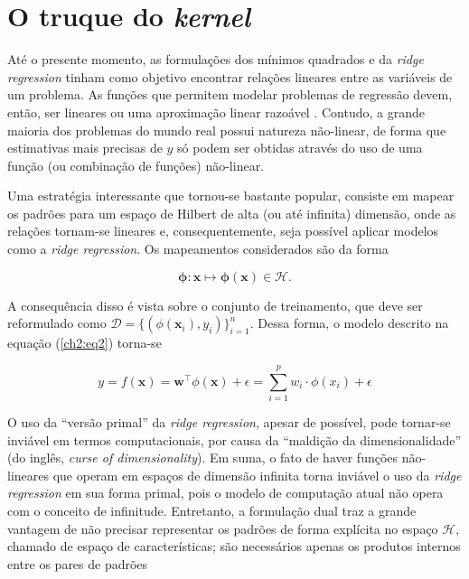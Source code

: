 \section{O truque do \textit{kernel}} \label{sec:kernel-trick}
Até o presente momento, as formulações dos mínimos quadrados e da \textit{ridge regression} tinham como objetivo encontrar relações lineares entre as variáveis de um problema. As funções que permitem modelar problemas de regressão devem, então, ser lineares ou uma aproximação linear razoável \cite{hastie2009}. Contudo, a grande maioria dos problemas do mundo real possui natureza não-linear, de forma que estimativas mais precisas de $y$ só podem ser obtidas através do uso de uma função (ou combinação de funções) não-linear.

Uma estratégia interessante que tornou-se bastante popular, consiste em mapear os padrões para um espaço de Hilbert de alta (ou até infinita) dimensão, onde as relações tornam-se lineares e, consequentemente, seja possível aplicar modelos como a \textit{ridge regression}. Os mapeamentos considerados são da forma

\begin{equation}
    \label{ch2:eq24}
    \mathbf{\phi} : \mathbf{x} \mapsto \mathbf{\phi}(\mathbf{x}) \in \mathcal{H}.
\end{equation}

\noindent A consequência disso é vista sobre o conjunto de treinamento, que deve ser reformulado como $\mathcal{D} = \{(\phi(\mathbf{x}_i), y_i)\}^{n}_{i=1}$. Dessa forma, o modelo descrito na equação (\ref{ch2:eq2}) torna-se

\begin{equation}
    \label{ch2:eq25}
    y = f(\mathbf{x}) = \mathbf{w}^{\top} \phi(\mathbf{x}) + \epsilon = \sum_{i=1}^{p}{w_i \cdot \phi(x_i)} + \epsilon
\end{equation}

O uso da ``versão primal'' da \textit{ridge regression}, apesar de possível, pode tornar-se inviável em termos computacionais, por causa da ``maldição da dimensionalidade'' (do inglês, \textit{curse of dimensionality}). Em suma, o fato de haver funções não-lineares que operam em espaços de dimensão infinita torna inviável o uso da \textit{ridge regression} em sua forma primal, pois o modelo de computação atual não opera com o conceito de infinitude. Entretanto, a formulação dual traz a grande vantagem de não precisar representar os padrões de forma explícita no espaço $ \mathcal{H}$, chamado de espaço de características; são necessários apenas os produtos internos entre os pares de padrões

